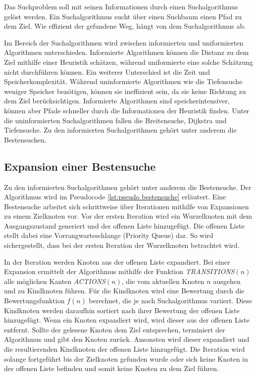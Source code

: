 Das Suchproblem soll mit seinen Informationen durch einen Suchalgorithmus gel\"{o}st werden. Ein Suchalgorithmus sucht \"{u}ber einen Suchbaum einen Pfad zu dem Ziel. Wie effizient der gefundene Weg, h\"{a}ngt von dem Suchalgorithmus ab. 

Im Bereich der Suchalgorithmen wird zwischen informierten und uniformierten Algorithmen unterschieden. Informierte Algorithmen k\"{o}nnen die Distanz zu dem Ziel mithilfe einer Heuristik sch\"{a}tzen, w\"{a}hrend uniformierte eine solche Sch\"{a}tzung nicht durchf\"{u}hren k\"{o}nnen. Ein weiterer Unterschied ist die Zeit und Speicherkomplexit\"{a}t. W\"{a}hrend uninformierte Algorithmen wie die Tiefensuche weniger Speicher ben\"{o}tigen, k\"{o}nnen sie ineffizient sein, da sie keine Richtung zu dem Ziel ber\"{u}cksichtigen. Informierte Algorithmen sind speicherintensiver, k\"{o}nnen aber Pfade schneller durch die Informationen der Heuristik finden. Unter die uninformierten Suchalgorithmen fallen die Breitensuche, Dijkstra und Tiefensuche. Zu den informierten Suchalgorithmen geh\"{o}rt unter anderem die Bestensuchen.


\subsection{Expansion einer Bestensuche}
\label{chap:bestensuche}

Zu den informierten Suchalgorithmen geh\"{o}rt unter anderem die Bestensuche. Der Algorithmus wird im Pseudocode \ref{lst:pseudo bestensuche} erläutert. Eine Bestensuche arbeitet sich schrittweise \"{u}ber Iterationen mithilfe von Expansionen zu einem Zielknoten vor. Vor der ersten Iteration wird ein Wurzelknoten mit dem Ausgangszustand generiert und der offenen Liste hinzugef\"{u}gt. Die offenen Liste stellt dabei eine Vorrangwarteschlange (Priority Queue) dar. So wird sichergestellt, dass bei der ersten Iteration der Wurzelknoten betrachtet wird.

In der Iteration werden Knoten aus der offenen Liste expandiert. Bei einer Expansion ermittelt der Algorithmus mithilfe der Funktion \textit{TRANSITIONS}$(n)$ alle m\"{o}glichen Kanten \textit{ACTIONS}$(n)$, die vom aktuellen Knoten $n$ ausgehen und zu Kindknoten f\"{u}hren. F\"{u}r die Kindknoten wird eine Bewertung durch die Bewertungsfunktion $f(n)$ berechnet, die je nach Suchalgorithmus variiert. Diese Kindknoten werden daraufhin sortiert nach ihrer Bewertung der offenen Liste hinzugef\"{u}gt. Wenn ein Knoten expandiert wird, wird dieser aus der offenen Liste entfernt. Sollte der gelesene Knoten dem Ziel entsprechen, terminiert der Algorithmus und gibt den Knoten zur\"{u}ck. Ansonsten wird dieser expandiert und die resultierenden Kindknoten der offenen Liste hinzugef\"{u}gt. Die Iteration wird solange fortgef\"{u}hrt bis der Zielknoten gefunden wurde oder sich keine Knoten in der offenen Liste befinden und somit keine Knoten zu dem Ziel f\"{u}hren.

